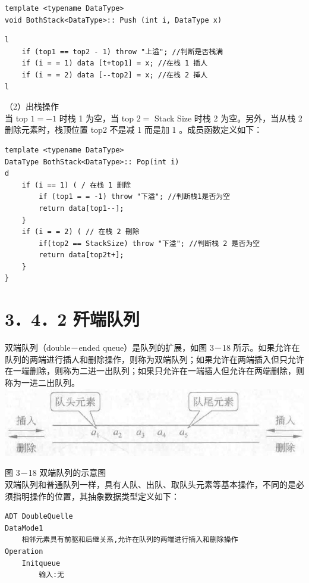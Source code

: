 \documentclass[10pt]{article}
\begin{document}
\begin{verbatim}
template <typename DataType>
void BothStack<DataType>:: Push (int i, DataType x)
\end{verbatim}

\begin{verbatim}
l
    if (top1 == top2 - 1) throw "上溢"; //判断是否栈满
    if (i = = 1) data [t+top1] = x; //在栈 1 插人
    if (i = = 2) data [--top2] = x; //在栈 2 挿人
l
\end{verbatim}

（2）出栈操作\\
当 top $1=-1$ 时栈 1 为空，当 top $2=$ Stack Size 时栈 2 为空。另外，当从栈 2 删除元素时，栈顶位置 top2 不是减 1 而是加 1 。成员函数定义如下：

\begin{verbatim}
template <typename DataType>
DataType BothStack<DataType>:: Pop(int i)
d
    if (i == 1) ( / 在栈 1 删除
        if (top1 = = -1) throw "下溢"; //判断栈1是否为空
        return data[top1--];
    }
    if (i = = 2) ( // 在栈 2 刪除
        if(top2 == StackSize) throw "下溢"; //判断栈 2 是否为空
        return data[top2t+];
    }
}
\end{verbatim}

\section*{3．4．2 歼端队列}
双端队列（double－ended queue）是队列的扩展，如图 3－18 所示。如果允许在队列的两端进行插人和删除操作，则称为双端队列；如果允许在两端插入但只允许在一端删除，则称为二进一出队列；如果只允许在一端插人但允许在两端删除，则称为一进二出队列。\\
\includegraphics[max width=\textwidth, center]{2025_06_06_704745ea57b15b2333e5g-101}

图 3－18 双端队列的示意图\\
双端队列和普通队列一样，具有人队、出队、取队头元素等基本操作，不同的是必须指明操作的位置，其抽象数据类型定义如下：

\begin{verbatim}
ADT DoubleQuelle
DataMode1
    相邻元素具有前驱和后继关系,允许在队列的两端进行揇入和删除操作
Operation
    Initqueue
        输入:无
\end{verbatim}
\end{document}
